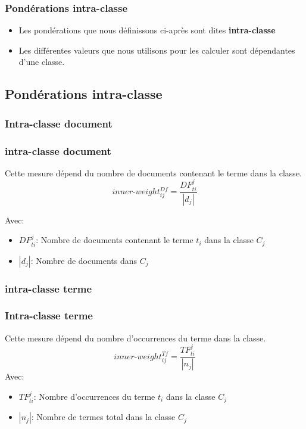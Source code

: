 \documentclass[12pt]{beamer}
\begin{document}
\begin{frame}
\frametitle{Pondérations intra-classe}
\begin{itemize}
\item Les pondérations que nous définissons ci-après sont dites \textbf{intra-classe} 
\item Les différentes valeurs que nous utilisons pour les calculer sont dépendantes d'une classe.
\end{itemize}
\end{frame}

\begin{frame}
\subsection{Pondérations intra-classe}
\frametitle{Intra-classe document}
\subsubsection*{intra-classe document}

Cette mesure dépend du nombre de documents contenant le terme dans la classe.
  \[ inner\mbox{-}weight_{ij}^{Df} = \frac{DF_{ti}^j}{|d_{j}|}\]
  
      Avec:
  \begin{itemize}
  	\item $DF_{ti}^j$: Nombre de documents contenant le terme $t_i$ dans la classe $C_j$	
  	\item $|d_{j}|$: Nombre de documents dans $C_j$	
    \end{itemize}
\end{frame}

\begin{frame}
\subsubsection*{intra-classe terme}
\frametitle{Intra-classe terme}
Cette mesure dépend du nombre d'occurrences du terme dans la classe.
\[   inner\mbox{-}weight_{ij}^{Tf} = \frac{TF_{ti}^j}{|n_{j}|}\]
  Avec:
\begin{itemize}
	\item $TF_{ti}^j$: Nombre d'occurrences du terme $t_i$ dans la classe $C_j$	
	\item $|n_{j}|$: Nombre de termes total dans la classe $C_j$	
  \end{itemize}
\end{frame}  
\end{document}
